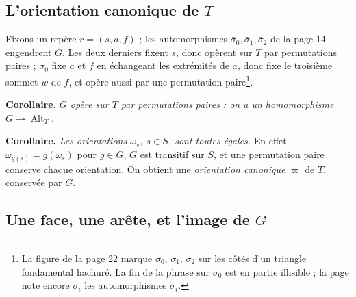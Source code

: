 \documentclass[11pt,a4paper]{article}
\begin{document}
\subsection*{L'orientation canonique de $T$}

Fixons un repère $r = (s, a, f)$ ; les automorphismes $\bar\sigma_0,
\bar\sigma_1, \bar\sigma_2$ de la page 14 engendrent $G$. Les deux derniers
fixent $s$, donc opèrent sur $T$ par permutations paires ; $\bar\sigma_0$ fixe
$a$ et $f$ en échangeant les extrémités de $a$, donc fixe le troisième sommet
$w$ de $f$, et opère aussi par une permutation paire\footnote{La figure de la
page 22 marque $\sigma_0$, $\sigma_1$, $\sigma_2$ sur les côtés d'un triangle
fondamental hachuré. La fin de la phrase sur $\sigma_0$ est en partie
illisible ; la page note encore $\sigma_i$ les automorphismes $\bar\sigma_i$.}.

\textbf{Corollaire.} \emph{$G$ opère sur $T$ par permutations paires : on a
un homomorphisme $G \to \operatorname{Alt}_T$.}

\textbf{Corollaire.} \emph{Les orientations $\omega_s$, $s \in S$, sont
toutes égales.} En effet $\omega_{g(s)} = g(\omega_s)$ pour $g \in G$, $G$ est
transitif sur $S$, et une permutation paire conserve chaque orientation. On
obtient une \emph{orientation canonique} $\varpi$ de $T$, conservée par $G$.

\subsection*{Une face, une arête, et l'image de $G$}
\end{document}
